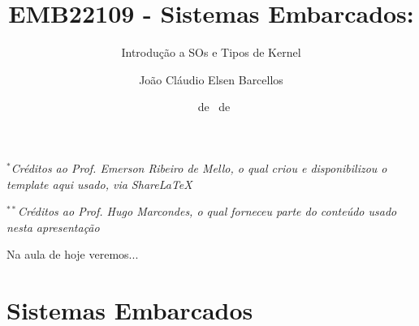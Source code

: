 \documentclass{beamer}
\title{EMB22109 - Sistemas Embarcados:}
\subtitle{\LARGE Introdução a SOs e Tipos de Kernel}
\author{João Cláudio Elsen Barcellos}
\date{\scriptsize \DAY~de \MONTH~de \YEAR}
\institute{
  Engenheiro Eletricista\\
  Formado na Universidade Federal de Santa Catarina\\
  campus Florianópolis\\
  \url{joaoclaudiobarcellos@gmail.com}
}
\begin{document}
\captionsetup{labelformat=empty}

\begin{frame}[t]
    \maketitle
    \vspace{-1cm}
    \begin{flushleft}
        \vfill
        \textit{\tiny $^{*}$Créditos ao Prof. Emerson Ribeiro de Mello, o qual criou e disponibilizou o template aqui usado, via ShareLaTeX}\par
        \textit{\tiny $^{**}$Créditos ao Prof. Hugo Marcondes, o qual forneceu parte do conteúdo usado nesta apresentação}
    \end{flushleft}
\end{frame}

\begin{frame}[t]{Na aula de hoje veremos...}
    \tableofcontents
\end{frame}

\section{Sistemas Embarcados}
\end{document}
